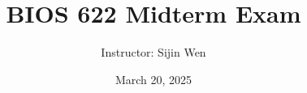 
\setlength{\oddsidemargin}{0.01in}
\setlength{\textwidth}{6.8in}
\setlength{\topmargin}{-0.51in}
\setlength{\textheight}{9.5in}


\def\bebf{\mbox{\boldmath $\beta$}}
\def\mubf{\mbox{\boldmath $\mu$}}
\def\epbf{\mbox{\scriptsize\boldmath $\epsilon$}}
\def\mus{\mbox{\scriptsize\boldmath $\mu$}}


\title{BIOS 622 Midterm Exam}
\vspace{0.2in}
\author{Instructor: Sijin Wen\\ }
\date{March 20, 2025}
\maketitle

\baselineskip=14pt

 

